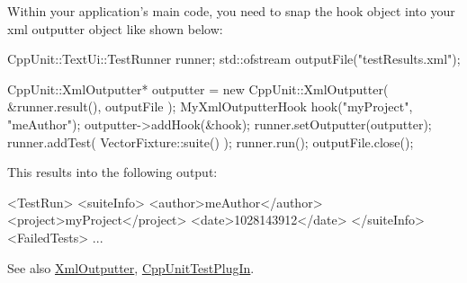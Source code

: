 Within your application's main code, you need to snap the hook object into your xml outputter object like shown below\+:


\begin{DoxyCode}
CppUnit::TextUi::TestRunner runner;
std::ofstream outputFile(\textcolor{stringliteral}{"testResults.xml"});

CppUnit::XmlOutputter* outputter = \textcolor{keyword}{new} CppUnit::XmlOutputter( &runner.result(),
                                                              outputFile );    
MyXmlOutputterHook hook(\textcolor{stringliteral}{"myProject"}, \textcolor{stringliteral}{"meAuthor"});
outputter->addHook(&hook);
runner.setOutputter(outputter);    
runner.addTest( VectorFixture::suite() );   
runner.run();
outputFile.close();
\end{DoxyCode}


This results into the following output\+:


\begin{DoxyCode}
<TestRun>
  <suiteInfo>
    <author>meAuthor</author>
    <project>myProject</project>
    <date>1028143912</date>
  </suiteInfo>
  <FailedTests>
   ...
\end{DoxyCode}


\begin{DoxySeeAlso}{See also}
\hyperlink{class_xml_outputter}{Xml\+Outputter}, \hyperlink{struct_cpp_unit_test_plug_in}{Cpp\+Unit\+Test\+Plug\+In}. 
\end{DoxySeeAlso}


